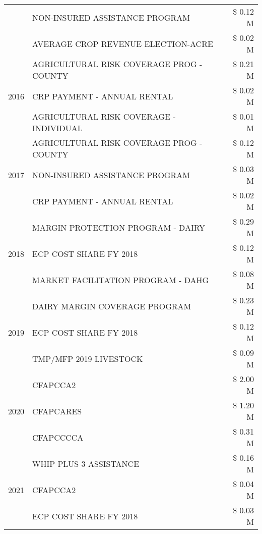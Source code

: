 \begin{tabular}{llr}
 & NON-INSURED ASSISTANCE PROGRAM & \$ 0.12 M \\
 & AVERAGE CROP REVENUE ELECTION-ACRE & \$ 0.02 M \\
\cline{1-3}
\multirow[t]{3}{*}{2016} & AGRICULTURAL RISK COVERAGE PROG - COUNTY & \$ 0.21 M \\
 & CRP PAYMENT - ANNUAL RENTAL & \$ 0.02 M \\
 & AGRICULTURAL RISK COVERAGE - INDIVIDUAL & \$ 0.01 M \\
\cline{1-3}
\multirow[t]{3}{*}{2017} & AGRICULTURAL RISK COVERAGE PROG - COUNTY & \$ 0.12 M \\
 & NON-INSURED ASSISTANCE PROGRAM & \$ 0.03 M \\
 & CRP PAYMENT - ANNUAL RENTAL & \$ 0.02 M \\
\cline{1-3}
\multirow[t]{3}{*}{2018} & MARGIN PROTECTION PROGRAM - DAIRY & \$ 0.29 M \\
 & ECP COST SHARE FY 2018 & \$ 0.12 M \\
 & MARKET FACILITATION PROGRAM - DAHG & \$ 0.08 M \\
\cline{1-3}
\multirow[t]{3}{*}{2019} & DAIRY MARGIN COVERAGE PROGRAM & \$ 0.23 M \\
 & ECP COST SHARE FY 2018 & \$ 0.12 M \\
 & TMP/MFP 2019 LIVESTOCK & \$ 0.09 M \\
\cline{1-3}
\multirow[t]{3}{*}{2020} & CFAPCCA2 & \$ 2.00 M \\
 & CFAPCARES & \$ 1.20 M \\
 & CFAPCCCCA & \$ 0.31 M \\
\cline{1-3}
\multirow[t]{3}{*}{2021} & WHIP PLUS 3 ASSISTANCE & \$ 0.16 M \\
 & CFAPCCA2 & \$ 0.04 M \\
 & ECP COST SHARE FY 2018 & \$ 0.03 M \\
\cline{1-3}
\bottomrule
\end{tabular}
